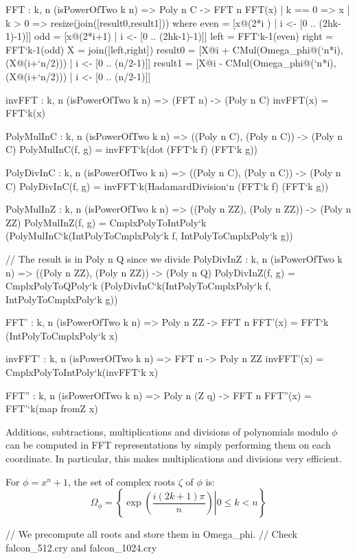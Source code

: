 \begin{code}
  FFT : {k, n} (isPowerOfTwo k n) => Poly n C -> FFT n
  FFT(x)
    | k == 0 => x
    | k >  0 => resize(join([result0,result1])) where
        even = [x@(2*i  ) | i <- [0 .. (2^^(k-1)-1)]]
        odd =  [x@(2*i+1) | i <- [0 .. (2^^(k-1)-1)]]
        left = FFT`{k-1}(even)
        right = FFT`{k-1}(odd)
        X = join([left,right])
        result0 =
          [X@i + CMul(Omega_phi@(`n*i),(X@(i+`n/2))) | i <- [0 .. (n/2-1)]]
        result1 =
          [X@i - CMul(Omega_phi@(`n*i),(X@(i+`n/2))) | i <- [0 .. (n/2-1)]]
	
  invFFT  : {k, n} (isPowerOfTwo k n) => (FFT n) -> (Poly n C)
  invFFT(x) = FFT`{k}(x)

  PolyMulInC : {k, n} (isPowerOfTwo k n) =>
    ((Poly n C), (Poly n C)) -> (Poly n C)
  PolyMulInC(f, g) = invFFT`{k}(dot (FFT`{k} f) (FFT`{k} g))

  PolyDivInC : {k, n} (isPowerOfTwo k n) =>
    ((Poly n C), (Poly n C)) -> (Poly n C)
  PolyDivInC(f, g) = invFFT`{k}(HadamardDivision`{n} (FFT`{k} f) (FFT`{k} g))

  PolyMulInZ : {k, n} (isPowerOfTwo k n) =>
    ((Poly n ZZ), (Poly n ZZ)) -> (Poly n ZZ)
  PolyMulInZ(f, g) = CmplxPolyToIntPoly`{k}
    (PolyMulInC`{k}(IntPolyToCmplxPoly`{k} f, IntPolyToCmplxPoly`{k} g))
 
  // The result is in Poly n Q since we divide
  PolyDivInZ : {k, n} (isPowerOfTwo k n) =>
    ((Poly n ZZ), (Poly n ZZ)) -> (Poly n Q)
  PolyDivInZ(f, g) = CmplxPolyToQPoly`{k}
    (PolyDivInC`{k}(IntPolyToCmplxPoly`{k} f, IntPolyToCmplxPoly`{k} g))

  FFT' : {k, n} (isPowerOfTwo k n) => Poly n ZZ -> FFT n
  FFT'(x) = FFT`{k} (IntPolyToCmplxPoly`{k} x)

  invFFT' : {k, n} (isPowerOfTwo k n) => FFT n -> Poly n ZZ
  invFFT'(x) = CmplxPolyToIntPoly`{k}(invFFT`{k} x)

  FFT'' : {k, n} (isPowerOfTwo k n) => Poly n (Z q) -> FFT n
  FFT''(x) = FFT'`{k}(map fromZ x)
\end{code}

 Additions, subtractions, multiplications and divisions of polynomials
 modulo $\phi$ can be computed in FFT representations by simply
 performing them on each coordinate. In particular, this makes
 multiplications and divisions very efficient.
 
 For $\phi = x^n + 1$, the set of complex roots $\zeta$ of $\phi$ is:
 \begin{equation}\label{eq:phi}
 \Omega_\phi = \left\{\left. \exp\left(\frac{i (2k+1)\pi}{n}\right) \right| 0 \leq k < n \right\}
 \end{equation}
\begin{code}
  // We precompute all roots and store them in Omega_phi.
  // Check falcon_512.cry and falcon_1024.cry
\end{code}
 
